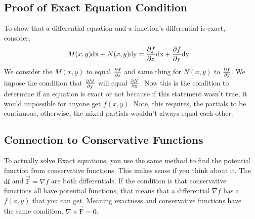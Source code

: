 \subsection{Proof of Exact Equation Condition}
To show that a differential equation and a function's differential is exact, consider, 
\begin{equation*}
M(x,y)\mathrm{dx} + N(x,y)\mathrm{dy} = \frac{\partial f}{\partial\mathrm{x}}\mathrm{dx}+\frac{\partial f}{\partial\mathrm{y}}\mathrm{dy}
\end{equation*}
We consider the $M(x,y)$ to equal $\frac{\partial f}{\partial\mathrm{x}}$ and same thing for $N(x,y)$ to $\frac{\partial f}{\partial\mathrm{y}}$. We impose the condition that $\frac{\partial M}{\partial\mathrm{y}}$ will equal $\frac{\partial N}{\partial\mathrm{x}}$. Now this is the condition to determine if an equation is exact or not because if this statement wasn't true, it would impossible for anyone get $f(x,y)$. Note, this requires, the partials to be continuous, otherwise, the mixed partials wouldn't always equal each other.
\subsection{Connection to Conservative Functions}
To actually solve Exact equations, you use the same method to find the potential function from conservative functions. This makes sense if you think about it. The $\mathrm{df}$ and $\vec{\mathrm{F}} = \nabla f$ are both differentials. If the condition is that conservative functions all have potential functions, that means that a differential $\nabla f$ has a $f(x,y)$ that you can get. Meaning exactness and conservative functions have the same condition, $\nabla \times \vec{\mathrm{F}} = 0$. 
\pagebreak
